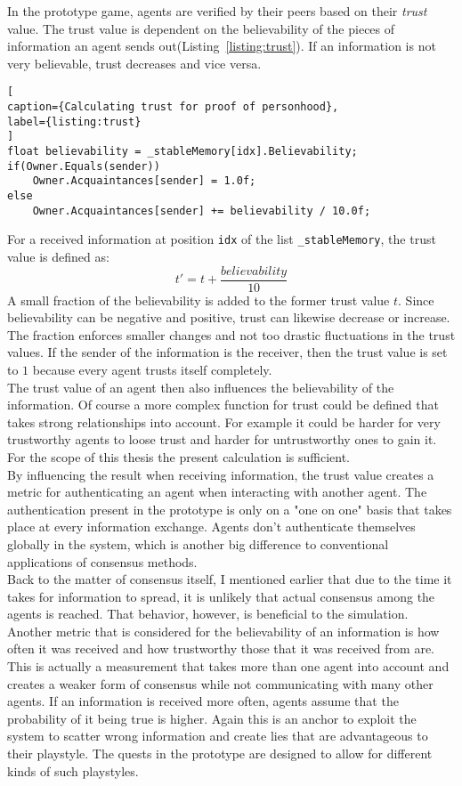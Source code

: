 In the prototype game, agents are verified by their peers based on their \textit{trust} value. The trust value is dependent on the believability of the pieces of information an agent sends out(Listing~\ref{listing:trust}). If an information is not very believable, trust decreases and vice versa.
\begin{lstlisting}[
caption={Calculating trust for proof of personhood},
label={listing:trust}
]
float believability = _stableMemory[idx].Believability;
if(Owner.Equals(sender))
	Owner.Acquaintances[sender] = 1.0f;
else
	Owner.Acquaintances[sender] += believability / 10.0f;
\end{lstlisting}
For a received information at position \verb|idx| of the list \verb|_stableMemory|, the trust value is defined as:
\begin{equation}
t' = t + \frac{believability}{10}
\end{equation}
A small fraction of the believability is added to the former trust value $t$. Since believability can be negative and positive, trust can likewise decrease or increase. The fraction enforces smaller changes and not too drastic fluctuations in the trust values. If the sender of the information is the receiver, then the trust value is set to $1$ because every agent trusts itself completely.\\
The trust value of an agent then also influences the believability of the information. Of course a more complex function for trust could be defined that takes strong relationships into account. For example it could be harder for very trustworthy agents to loose trust and harder for untrustworthy ones to gain it. For the scope of this thesis the present calculation is sufficient.\\
By influencing the result when receiving information, the trust value creates a metric for authenticating an agent when interacting with another agent. The authentication present in the prototype is only on a "one on one" basis that takes place at every information exchange. Agents don't authenticate themselves globally in the system, which is another big difference to conventional applications of consensus methods.\\
Back to the matter of consensus itself, I mentioned earlier that due to the time it takes for information to spread, it is unlikely that actual consensus among the agents is reached. That behavior, however, is beneficial to the simulation.\\
Another metric that is considered for the believability of an information is how often it was received and how trustworthy those that it was received from are. This is actually a measurement that takes more than one agent into account and creates a weaker form of consensus while not communicating with many other agents. If an information is received more often, agents assume that the probability of it being true is higher. Again this is an anchor to exploit the system to scatter wrong information and create lies that are advantageous to their playstyle. The quests in the prototype are designed to allow for different kinds of such playstyles.
